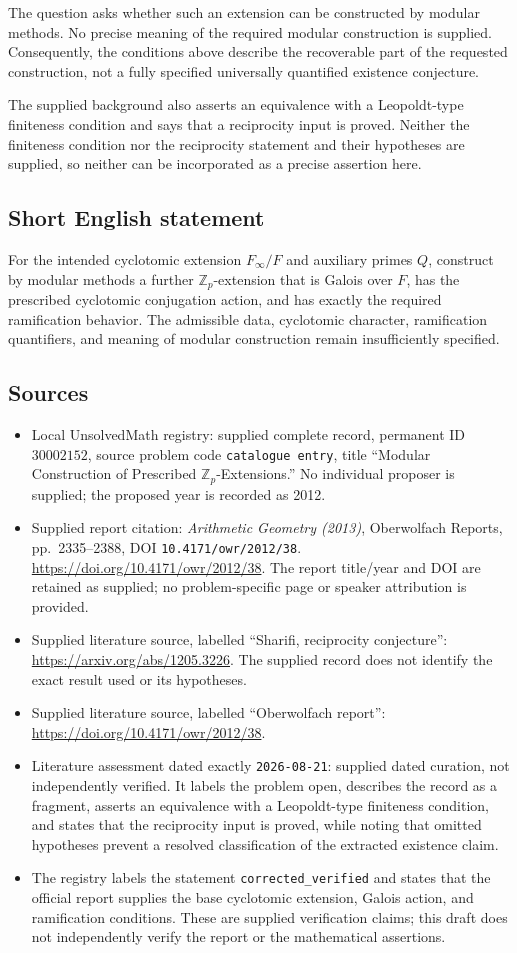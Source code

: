 \documentclass[11pt]{article}
\newcommand{\Z}{\mathbb{Z}}
\begin{document}
The question asks whether such an extension can be constructed by modular methods. No precise meaning of the required modular construction is supplied. Consequently, the conditions above describe the recoverable part of the requested construction, not a fully specified universally quantified existence conjecture.

The supplied background also asserts an equivalence with a Leopoldt-type finiteness condition and says that a reciprocity input is proved. Neither the finiteness condition nor the reciprocity statement and their hypotheses are supplied, so neither can be incorporated as a precise assertion here.
\subsection{Short English statement}
For the intended cyclotomic extension \(F_\infty/F\) and auxiliary primes \(Q\), construct by modular methods a further \(\Z_p\)-extension that is Galois over \(F\), has the prescribed cyclotomic conjugation action, and has exactly the required ramification behavior. The admissible data, cyclotomic character, ramification quantifiers, and meaning of modular construction remain insufficiently specified.
\subsection{Sources}
\begin{itemize}
\item Local UnsolvedMath registry: supplied complete record, permanent ID \(30002152\), source problem code \texttt{catalogue entry}, title ``Modular Construction of Prescribed \(\Z_p\)-Extensions.'' No individual proposer is supplied; the proposed year is recorded as 2012.
\item Supplied report citation: \emph{Arithmetic Geometry (2013)}, Oberwolfach Reports, pp.~2335--2388, DOI \texttt{10.4171/owr/2012/38}. \url{https://doi.org/10.4171/owr/2012/38}. The report title/year and DOI are retained as supplied; no problem-specific page or speaker attribution is provided.
\item Supplied literature source, labelled ``Sharifi, reciprocity conjecture'': \url{https://arxiv.org/abs/1205.3226}. The supplied record does not identify the exact result used or its hypotheses.
\item Supplied literature source, labelled ``Oberwolfach report'': \url{https://doi.org/10.4171/owr/2012/38}.
\item Literature assessment dated exactly \texttt{2026-08-21}: supplied dated curation, not independently verified. It labels the problem open, describes the record as a fragment, asserts an equivalence with a Leopoldt-type finiteness condition, and states that the reciprocity input is proved, while noting that omitted hypotheses prevent a resolved classification of the extracted existence claim.
\item The registry labels the statement \texttt{corrected\_verified} and states that the official report supplies the base cyclotomic extension, Galois action, and ramification conditions. These are supplied verification claims; this draft does not independently verify the report or the mathematical assertions.
\end{itemize}
\end{document}
